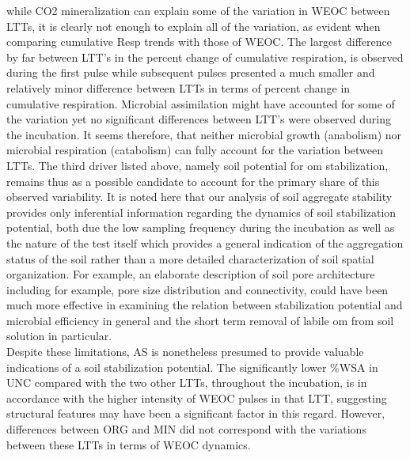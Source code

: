 	while  CO2 mineralization can explain some of the variation in WEOC between LTTs, it is clearly not enough to explain all of the variation, as evident when comparing cumulative Resp trends with those of WEOC. The largest difference by far between LTT's in the percent change of cumulative respiration, is observed during the first pulse while subsequent pulses presented a much smaller and relatively minor difference between LTTs in terms of percent change in cumulative respiration.
	Microbial assimilation might have accounted for some of the variation yet no significant differences between LTT's were observed during the incubation.
	It seems therefore, that neither microbial growth (anabolism) nor microbial respiration (catabolism) can fully account for the variation between LTTs. The third driver listed above, namely soil potential for \gls{om} stabilization, remains thus as a possible candidate to account for the primary share of this observed variability. It is noted here that our analysis of soil aggregate stability provides only inferential information regarding the dynamics of soil stabilization potential, both due the low sampling frequency during the incubation as well as the nature of the test itself which provides a general indication of the aggregation status of the soil rather than a more detailed characterization of soil spatial organization. For example, an elaborate description of soil pore architecture including for example, pore size distribution and connectivity, could have been much more effective in examining the relation between stabilization potential and microbial efficiency in general and the short term removal of labile \gls{om} from soil solution in particular. \\
	Despite these limitations, AS is nonetheless presumed to provide valuable indications of a soil stabilization potential. The significantly lower \%WSA in UNC compared with the two other LTTs, throughout the incubation, is in accordance with the higher intensity of WEOC pulses in that LTT, suggesting structural features may have been a significant factor in this regard. However, differences between ORG and MIN did not correspond with the variations between these LTTs in terms of WEOC dynamics.  \\


